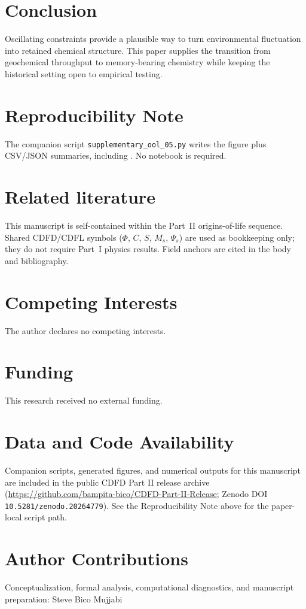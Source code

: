 \documentclass[11pt,a4paper]{article}
\begin{document}
\section{Conclusion}
Oscillating constraints provide a plausible way to turn environmental fluctuation into retained chemical structure. This paper supplies the transition from geochemical throughput to memory-bearing chemistry while keeping the historical setting open to empirical testing.

\section{Reproducibility Note}
The companion script \texttt{supplementary\_ool\_05.py} writes the figure
 plus CSV/JSON
summaries, including . No
notebook is required.

\section*{Related literature}
This manuscript is self-contained within the Part~II origins-of-life sequence. Shared CDFD/CDFL symbols ($\Phi$, $C$, $S$, $M_s$, $\Psi_s$) are used as bookkeeping only; they do not require Part~I physics results. Field anchors are cited in the body and bibliography.

\section*{Competing Interests}
The author declares no competing interests.

\section*{Funding}
This research received no external funding.

\section*{Data and Code Availability}
Companion scripts, generated figures, and numerical outputs for this manuscript are included in the public CDFD Part II release archive (\url{https://github.com/bampita-bico/CDFD-Part-II-Release}; Zenodo DOI \texttt{10.5281/zenodo.20264779}). See the Reproducibility Note above for the paper-local script path.

\section*{Author Contributions}
Conceptualization, formal analysis, computational diagnostics, and manuscript preparation: Steve Bico Mujjabi



\end{document}
